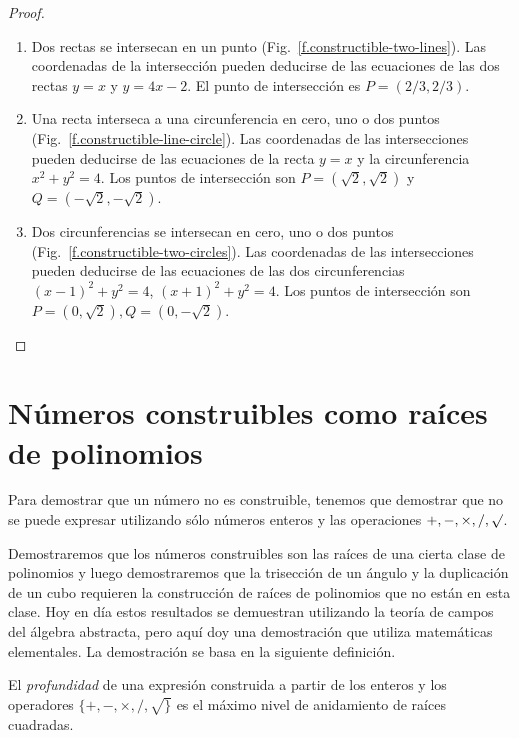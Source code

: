 \begin{proof}
\begin{enumerate}
\item Dos rectas se intersecan en un punto (Fig.~\ref{f.constructible-two-lines}). Las coordenadas de la intersección pueden deducirse de las ecuaciones de las dos rectas $y=x$ y $y=4x-2$. El punto de intersección es $P= (2/3, 2/3)$.

\item Una recta interseca a una circunferencia en cero, uno o dos puntos (Fig.~\ref{f.constructible-line-circle}). Las coordenadas de las intersecciones pueden deducirse de las ecuaciones de la recta $y=x$ y la circunferencia $x^2+y^2=4$. Los puntos de intersección son
$P=(\sqrt{2}, \sqrt{2})$ y $Q=(-\sqrt{2}, -\sqrt{2})$.

\item Dos circunferencias se intersecan en cero, uno o dos puntos (Fig.~\ref{f.constructible-two-circles}). Las coordenadas de las intersecciones pueden deducirse de las ecuaciones de las dos circunferencias $(x-1)^2+y^2=4$, $(x+1)^2+y^2=4$. Los puntos de intersección son $P=(0,\sqrt{2}),Q=(0,-\sqrt{2})$.
\end{enumerate}
\end{proof}


\section{Números construibles como raíces de polinomios}\label{s.trisect-poly}

Para demostrar que un número no es construible, tenemos que demostrar que no se puede expresar utilizando sólo números enteros y las operaciones $ {+,-,\times,/,\surd}$.

Demostraremos que los números construibles son las raíces de una cierta clase de polinomios y luego demostraremos que la trisección de un ángulo y la duplicación de un cubo requieren la construcción de raíces de polinomios que no están en esta clase. Hoy en día estos resultados se demuestran utilizando la teoría de campos del álgebra abstracta, pero aquí doy una demostración que utiliza matemáticas elementales. La demostración se basa en la siguiente definición.

\begin{definition}
El \emph{profundidad} de una expresión construida a partir de los enteros y los operadores $\{+,-,\times,/,\surd\}$ es el máximo nivel de anidamiento de raíces cuadradas.
\end{definition}

